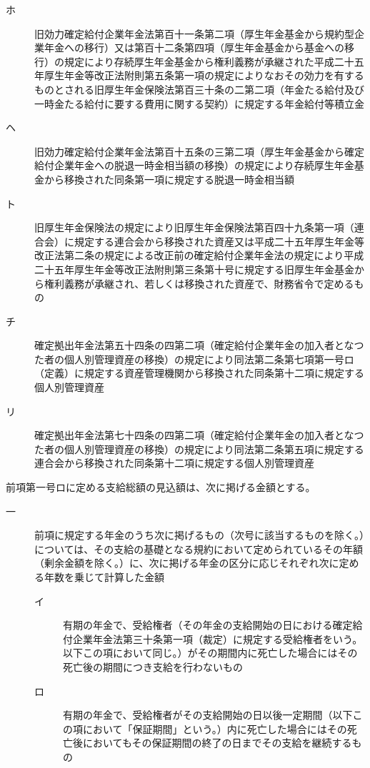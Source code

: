 \documentclass[twocolumn,a4j,10pt]{ltjtarticle}
\begin{document}
\begin{description}
\begin{description}
\begin{description}
\item[ホ]旧効力確定給付企業年金法第百十一条第二項（厚生年金基金から規約型企業年金への移行）又は第百十二条第四項（厚生年金基金から基金への移行）の規定により存続厚生年金基金から権利義務が承継された平成二十五年厚生年金等改正法附則第五条第一項の規定によりなおその効力を有するものとされる旧厚生年金保険法第百三十条の二第二項（年金たる給付及び一時金たる給付に要する費用に関する契約）に規定する年金給付等積立金
\item[ヘ]旧効力確定給付企業年金法第百十五条の三第二項（厚生年金基金から確定給付企業年金への脱退一時金相当額の移換）の規定により存続厚生年金基金から移換された同条第一項に規定する脱退一時金相当額
\item[ト]旧厚生年金保険法の規定により旧厚生年金保険法第百四十九条第一項（連合会）に規定する連合会から移換された資産又は平成二十五年厚生年金等改正法第二条の規定による改正前の確定給付企業年金法の規定により平成二十五年厚生年金等改正法附則第三条第十号に規定する旧厚生年金基金から権利義務が承継され、若しくは移換された資産で、財務省令で定めるもの
\item[チ]確定拠出年金法第五十四条の四第二項（確定給付企業年金の加入者となつた者の個人別管理資産の移換）の規定により同法第二条第七項第一号ロ（定義）に規定する資産管理機関から移換された同条第十二項に規定する個人別管理資産
\item[リ]確定拠出年金法第七十四条の四第二項（確定給付企業年金の加入者となつた者の個人別管理資産の移換）の規定により同法第二条第五項に規定する連合会から移換された同条第十二項に規定する個人別管理資産
\end{description}
\end{description}
\item[\rensuji{2}]前項第一号ロに定める支給総額の見込額は、次に掲げる金額とする。
\begin{description}
\item[一]前項に規定する年金のうち次に掲げるもの（次号に該当するものを除く。）については、その支給の基礎となる規約において定められているその年額（剰余金額を除く。）に、次に掲げる年金の区分に応じそれぞれ次に定める年数を乗じて計算した金額
\begin{description}
\item[イ]有期の年金で、受給権者（その年金の支給開始の日における確定給付企業年金法第三十条第一項（裁定）に規定する受給権者をいう。以下この項において同じ。）がその期間内に死亡した場合にはその死亡後の期間につき支給を行わないもの
\item[ロ]有期の年金で、受給権者がその支給開始の日以後一定期間（以下この項において「保証期間」という。）内に死亡した場合にはその死亡後においてもその保証期間の終了の日までその支給を継続するもの

\end{description}
\end{description}
\end{description}
\end{document}
